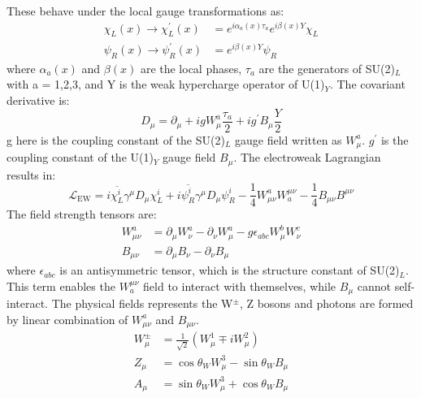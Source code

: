 These behave under the local gauge transformations as:
\begin{equation}
\begin{aligned}
\chi_{L}(x) \rightarrow \chi_{L}^{\prime}(x) &=e^{i \alpha_{a}(x) \tau_{a}} e^{i \beta(x) Y} \chi_{L} \\
\psi_{R}(x) \rightarrow \psi_{R}^{\prime}(x) &=e^{i \beta(x) Y} \psi_{R}
\end{aligned}
\end{equation}
where $\alpha_{a}(x)$ and $\beta(x)$ are the local phases, $\tau_{a}$ are the generators of SU(2)$_L$ with a = 1,2,3, and Y is the weak hypercharge operator of U(1)$_Y$. The covariant derivative is:
\begin{equation}
D_{\mu}=\partial_{\mu}+i g W_{\mu}^{a} \frac{\tau_{a}}{2}+i g^{\prime} B_{\mu} \frac{Y}{2}
\end{equation}
g here is the coupling constant of the SU(2)$_L$ gauge field written as $W_{\mu}^{a}$. $g^{\prime}$ is the coupling constant of the U(1)$_Y$ gauge field $B_{\mu}$.
The electroweak Lagrangian results in:
\begin{equation}
\mathcal{L}_{\mathrm{EW}}=i \overline{\chi_{L}^{i}} \gamma^{\mu} D_{\mu} \chi_{L}^{i}+i \overline{\psi_{R}^{i}} \gamma^{\mu} D_{\mu} \psi_{R}^{i}-\frac{1}{4} W_{\mu \nu}^{a} W_{a}^{\mu \nu}-\frac{1}{4} B_{\mu \nu} B^{\mu \nu}
\end{equation}
The field strength tensors are:
\begin{equation}
\begin{aligned}
W_{\mu \nu}^{a} &=\partial_{\mu} W_{\nu}^{a}-\partial_{\nu} W_{\mu}^{a}-g \epsilon_{a b c} W_{\mu}^{b} W_{\nu}^{c} \\
B_{\mu \nu} &=\partial_{\mu} B_{\nu}-\partial_{\nu} B_{\mu}
\end{aligned}
\end{equation}
where $\epsilon_{a b c}$ is an antisymmetric tensor, which is the structure constant of SU(2)$_L$. This term enables the $W_{a}^{\mu \nu}$ field to interact with themselves, while $B_{\mu}$ cannot self-interact.
The physical fields represents the W$^{\pm}$, Z bosons and photons are formed by linear combination of $W_{\mu \nu}^{a}$ and $B_{\mu \nu}$.
\begin{equation}
\begin{aligned}
W_{\mu}^{\pm} &=\frac{1}{\sqrt{2}}\left(W_{\mu}^{1} \mp i W_{\mu}^{2}\right) \\
Z_{\mu} &=\cos \theta_{W} W_{\mu}^{3}-\sin \theta_{W} B_{\mu} \\
A_{\mu} &=\sin \theta_{W} W_{\mu}^{3}+\cos \theta_{W} B_{\mu}
\end{aligned}
\end{equation}
